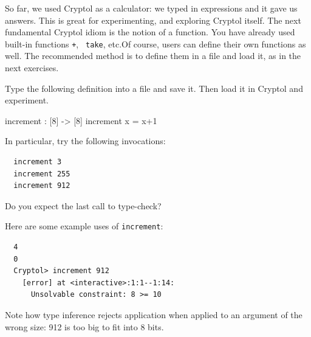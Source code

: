 So far, we used Cryptol as a calculator: we typed in expressions and
it gave us answers. This is great for experimenting, and exploring
Cryptol itself. The next fundamental Cryptol idiom is the notion of a
function. You have already used built-in functions {\tt +}, {\tt
  take}, etc.{\indPlus\indLg}Of course, users can define their own
functions as well. The recommended method is to define them in a file
and load it, as in the next exercises.


\begin{Exercise}\label{ex:fn:0}
  Type the following definition into a file and save it. Then load it
  in Cryptol and experiment.
\begin{code}
  increment : [8] -> [8]
  increment x = x+1
\end{code}
In particular, try the following invocations:
\begin{Verbatim}
  increment 3
  increment 255
  increment 912
\end{Verbatim}
Do you expect the last call to type-check?
\end{Exercise}
\begin{Answer}
Here are some example uses of {\tt increment}:
\begin{Verbatim}
  4
  0
  Cryptol> increment 912
    [error] at <interactive>:1:1--1:14:
      Unsolvable constraint: 8 >= 10
\end{Verbatim}
Note how type inference rejects application when applied to an
argument of the wrong size: 912 is too big to fit into 8 bits.
\end{Answer}

\indFunApp

